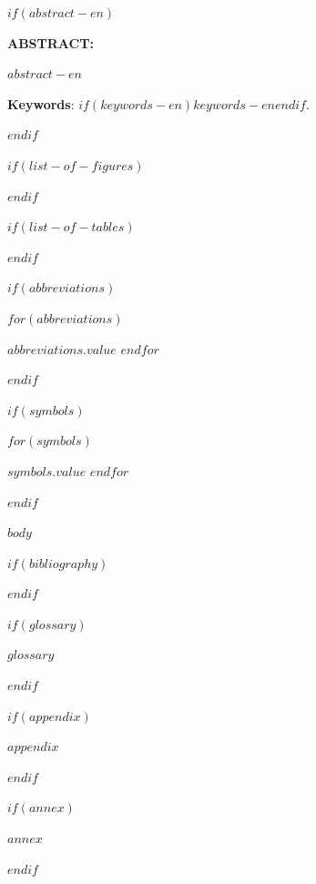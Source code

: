 \documentclass[
  12pt,
  oneside,
  a4paper,
  chapter=TITLE,
  english,
  $if(lang)$$lang$$else$portuguese$endif$
]{abntex2}
\begin{document}
$if(abstract-en)$
\newpage
\thispagestyle{empty}
\renewcommand{\resumoname}{Abstract}
\begin{resumoumacoluna}
\noindent\textbf{ABSTRACT:}\vspace{\onelineskip}

$abstract-en$

\vspace{\onelineskip}
\noindent\textbf{Keywords}: $if(keywords-en)$$keywords-en$$endif$.
\end{resumoumacoluna}
\clearpage
$endif$

$if(list-of-figures)$
\listoffigures*
\cleardoublepage
$endif$

$if(list-of-tables)$
\listoftables*
\cleardoublepage
$endif$

$if(abbreviations)$
\begin{siglas}
$for(abbreviations)$
  \item[$abbreviations.key$] $abbreviations.value$
$endfor$
\end{siglas}
$endif$

$if(symbols)$
\begin{simbolos}
$for(symbols)$
  \item[$symbols.key$] $symbols.value$
$endfor$
\end{simbolos}
$endif$

\tableofcontents*
\cleardoublepage

\textual
\setcounter{secnumdepth}{3}

$body$

\postextual

$if(bibliography)$


$endif$

$if(glossary)$
\begin{glossario}
$glossary$
\end{glossario}
$endif$

$if(appendix)$
\begin{apendicesenv}
$appendix$
\end{apendicesenv}
$endif$

$if(annex)$
\begin{anexosenv}
$annex$
\end{anexosenv}
$endif$
\end{document}
